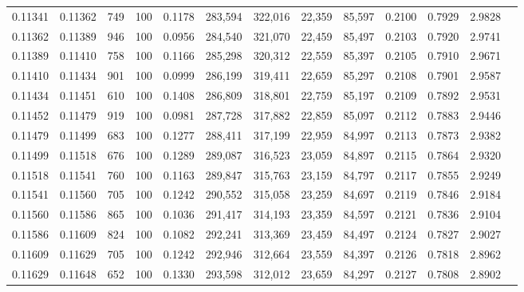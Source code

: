 \begin{tabular}{rrrrrrrrrrrrr}
0.11341 & 0.11362 &   749 & 100 &                                     0.1178 & 283,594 & 322,016 &  22,359 &  85,597 & 0.2100 & 0.7929 & 2.9828 \\
0.11362 & 0.11389 &   946 & 100 &                                     0.0956 & 284,540 & 321,070 &  22,459 &  85,497 & 0.2103 & 0.7920 & 2.9741 \\
0.11389 & 0.11410 &   758 & 100 &                                     0.1166 & 285,298 & 320,312 &  22,559 &  85,397 & 0.2105 & 0.7910 & 2.9671 \\
0.11410 & 0.11434 &   901 & 100 &                                     0.0999 & 286,199 & 319,411 &  22,659 &  85,297 & 0.2108 & 0.7901 & 2.9587 \\
0.11434 & 0.11451 &   610 & 100 &                                     0.1408 & 286,809 & 318,801 &  22,759 &  85,197 & 0.2109 & 0.7892 & 2.9531 \\
0.11452 & 0.11479 &   919 & 100 &                                     0.0981 & 287,728 & 317,882 &  22,859 &  85,097 & 0.2112 & 0.7883 & 2.9446 \\
0.11479 & 0.11499 &   683 & 100 &                                     0.1277 & 288,411 & 317,199 &  22,959 &  84,997 & 0.2113 & 0.7873 & 2.9382 \\
0.11499 & 0.11518 &   676 & 100 &                                     0.1289 & 289,087 & 316,523 &  23,059 &  84,897 & 0.2115 & 0.7864 & 2.9320 \\
0.11518 & 0.11541 &   760 & 100 &                                     0.1163 & 289,847 & 315,763 &  23,159 &  84,797 & 0.2117 & 0.7855 & 2.9249 \\
0.11541 & 0.11560 &   705 & 100 &                                     0.1242 & 290,552 & 315,058 &  23,259 &  84,697 & 0.2119 & 0.7846 & 2.9184 \\
0.11560 & 0.11586 &   865 & 100 &                                     0.1036 & 291,417 & 314,193 &  23,359 &  84,597 & 0.2121 & 0.7836 & 2.9104 \\
0.11586 & 0.11609 &   824 & 100 &                                     0.1082 & 292,241 & 313,369 &  23,459 &  84,497 & 0.2124 & 0.7827 & 2.9027 \\
0.11609 & 0.11629 &   705 & 100 &                                     0.1242 & 292,946 & 312,664 &  23,559 &  84,397 & 0.2126 & 0.7818 & 2.8962 \\
0.11629 & 0.11648 &   652 & 100 &                                     0.1330 & 293,598 & 312,012 &  23,659 &  84,297 & 0.2127 & 0.7808 & 2.8902 \\

\end{tabular}

